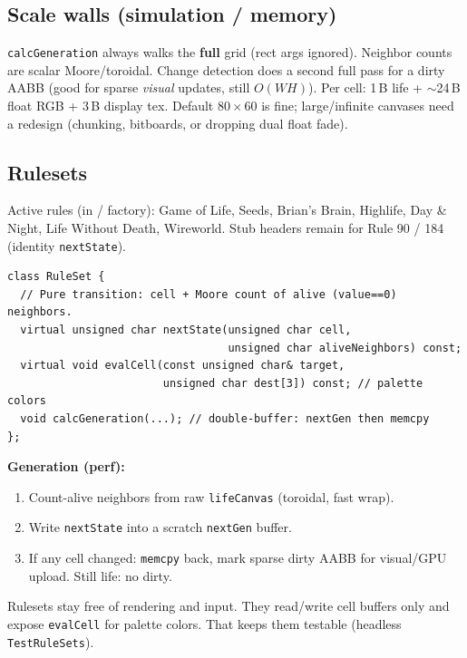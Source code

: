 \subsection{Scale walls (simulation / memory)}
\begin{statusbox}
\texttt{calcGeneration} always walks the \textbf{full} grid (rect args ignored).
Neighbor counts are scalar Moore/toroidal. Change detection does a second full
pass for a dirty AABB (good for sparse \emph{visual} updates, still $O(WH)$).
Per cell: 1\,B life + $\sim$24\,B float RGB + 3\,B display tex.
Default $80\times 60$ is fine; large/infinite canvases need a redesign (chunking,
bitboards, or dropping dual float fade).
\end{statusbox}

\subsection{Rulesets}
Active rules (in  / factory): Game of Life, Seeds, Brian's
Brain, Highlife, Day \& Night, Life Without Death, Wireworld. Stub headers
remain for Rule 90 / 184 (identity \texttt{nextState}).

\begin{lstlisting}
class RuleSet {
  // Pure transition: cell + Moore count of alive (value==0) neighbors.
  virtual unsigned char nextState(unsigned char cell,
                                  unsigned char aliveNeighbors) const;
  virtual void evalCell(const unsigned char& target,
                        unsigned char dest[3]) const; // palette colors
  void calcGeneration(...); // double-buffer: nextGen then memcpy
};
\end{lstlisting}

\textbf{Generation (perf):}
\begin{enumerate}
  \item Count-alive neighbors from raw \texttt{lifeCanvas} (toroidal, fast wrap).
  \item Write \texttt{nextState} into a scratch \texttt{nextGen} buffer.
  \item If any cell changed: \texttt{memcpy} back, mark sparse dirty AABB for
        visual/GPU upload. Still life: no dirty.
\end{enumerate}

\begin{decisionbox}[title={Keep rules pure}]
Rulesets stay free of rendering and input. They read/write cell buffers only
and expose \texttt{evalCell} for palette colors. That keeps them testable
(headless \texttt{TestRuleSets}).
\end{decisionbox}

